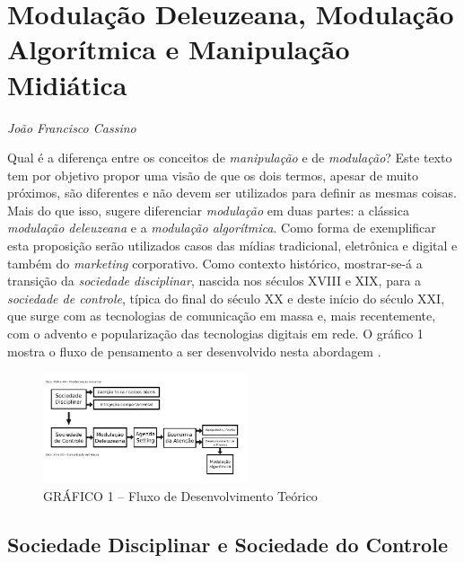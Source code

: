 \chapter{Modulação Deleuzeana, Modulação Algorítmica e Manipulação Midiática}

\begin{flushright}
\emph{João Francisco Cassino}
\end{flushright}

Qual é a diferença entre os conceitos de \emph{manipulação} e de
\emph{modulação}? Este texto tem por objetivo propor uma visão de que os
dois termos, apesar de muito próximos, são diferentes e não devem ser
utilizados para definir as mesmas coisas. Mais do que isso, sugere
diferenciar \emph{modulação} em duas partes: a clássica \emph{modulação
deleuzeana} e a \emph{modulação algorítmica}. Como forma de exemplificar
esta proposição serão utilizados casos das mídias tradicional,
eletrônica e digital e também do \emph{marketing} corporativo. Como
contexto histórico, mostrar-se-á a transição da \emph{sociedade
disciplinar}, nascida nos séculos XVIII e XIX, para a \emph{sociedade de
controle}, típica do final do século XX e deste início do século XXI,
que surge com as tecnologias de comunicação em massa e, mais
recentemente, com o advento e popularização das tecnologias digitais em
rede. O gráfico 1 mostra o fluxo de pensamento a ser desenvolvido nesta
abordagem .

\begin{figure}[!ht]
  \includegraphics[width=60mm]{./imgs/grafico1.png}
\caption{GRÁFICO 1 -- Fluxo de Desenvolvimento Teórico}
 \end{figure}

\section{Sociedade Disciplinar e Sociedade do Controle}

